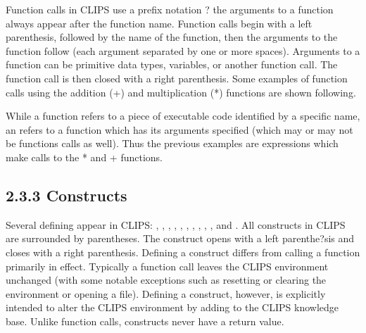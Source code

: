 \documentclass[letterpaper,10pt,english]{sphinxmanual}
\begin{document}
Function calls in CLIPS use a prefix notation ? the arguments to a
function always appear after the function name. Function calls begin
with a left parenthesis, followed by the name of the function, then the
arguments to the function follow (each argument separated by one or more
spaces). Arguments to a function can be primitive data types, variables,
or another function call. The function call is then closed with a right
parenthesis. Some examples of function calls using the addition (+) and
multiplication (*) functions are shown following.

\begin{sphinxVerbatim}[commandchars=\\\{\}]
   

\PYGZbs{}   

  \PYGZbs{}   

\PYGZbs{}    \PYGZbs{}     \PYGZbs{}  
\end{sphinxVerbatim}

While a function refers to a piece of executable code identified by a
specific name, an  refers to a function which has its
arguments specified (which may or may not be functions calls as well).
Thus the previous examples are expressions which make calls to the *
and + functions.


\subsection{2.3.3 Constructs}
\label{\detokenize{overview:constructs}}
Several defining  appear in CLIPS: ,
, , , ,
, , , ,
, and . All constructs in CLIPS are
surrounded by parentheses. The construct opens with a left parenthe?sis
and closes with a right parenthesis. Defining a construct differs from
calling a function primarily in effect. Typically a function call leaves
the CLIPS environment unchanged (with some notable exceptions such as
resetting or clearing the environment or opening a file). Defining a
construct, however, is explicitly intended to alter the CLIPS
environment by adding to the CLIPS knowledge base. Unlike function
calls, constructs never have a return value.
\end{document}

